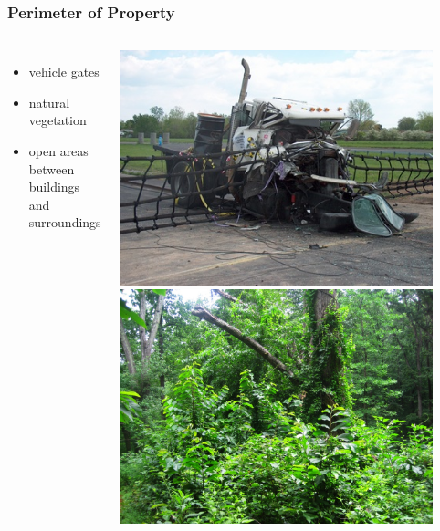 \documentclass[]{beamer}
\begin{document}
\begin{frame}
  \frametitle{Perimeter of Property}
  \begin{columns}[c]
    \begin{itemize}
      \item vehicle gates
      \item natural vegetation
      \item open areas between buildings and surroundings
    \end{itemize}
    \includegraphics[width=0.9\textwidth]{vehicle-impact2}
    \vspace{2mm}
    \includegraphics[width=0.9\textwidth]{vegetation}
  \end{columns}
\end{frame}
\end{document}
